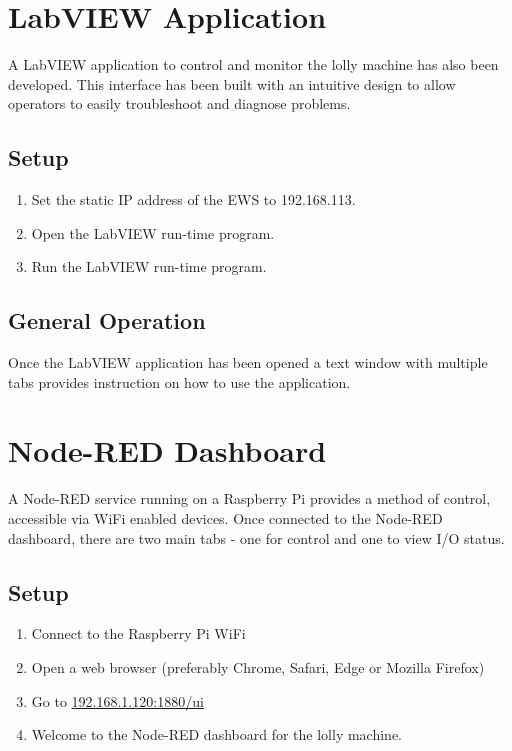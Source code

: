             
\section{LabVIEW Application}
        A LabVIEW application to control and monitor the lolly machine has also been developed. This interface has been built with an intuitive design to allow operators to easily troubleshoot and diagnose problems.
        
    \subsection{Setup} 
        \begin{enumerate}
            \item Set the static IP address of the EWS to 192.168.113.
            \item Open the LabVIEW run-time program.
            \item Run the LabVIEW run-time program.
        \end{enumerate}
        
    \subsection{General Operation}
        Once the LabVIEW application has been opened a text window with multiple tabs provides instruction on how to use the application. 
        
\section{Node-RED Dashboard}
    A Node-RED service running on a Raspberry Pi provides a method of control, accessible via WiFi enabled devices.
    Once connected to the Node-RED dashboard, there are two main tabs - one for control and one to view I/O status. 
    
    \subsection{Setup}
        \begin{enumerate}
            \item Connect to the Raspberry Pi WiFi
            \item Open a web browser (preferably Chrome, Safari, Edge or Mozilla Firefox)
            \item Go to \href{https://192.168.1.120:1880/ui}{192.168.1.120:1880/ui}
            \item Welcome to the Node-RED dashboard for the lolly machine. 
        \end{enumerate}
        
